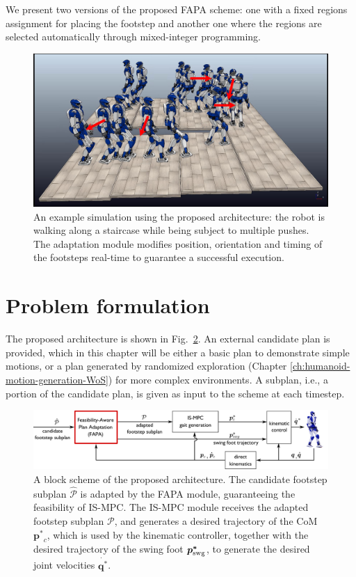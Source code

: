 We present two versions of the proposed FAPA scheme: one with a fixed regions
assignment for placing the footstep and another one where the regions are
selected automatically through mixed-integer programming.

\begin{figure}
    \centering
    \includegraphics[trim={0.5cm 1.5cm 2cm 0.1cm},clip,width=0.9\columnwidth]{figures/strobo-staircase-with-pushes-2.jpeg}
    \caption{An example simulation using the proposed architecture: the robot is walking along a staircase while being subject to multiple pushes. The adaptation module modifies position, orientation and timing of the footsteps real-time to guarantee a successful execution.}
    \label{fig:FAPA:two-patches-mixed-integer-snapshots}
\end{figure}

\section{Problem formulation} 
\label{sec:FAPA:ProblemFormulation}
The proposed architecture is shown in Fig.~\ref{fig:FAPA:block_scheme}.
An external candidate plan is provided, which in this chapter will be either
a basic plan to demonstrate simple motions, or a plan generated by randomized
exploration (Chapter \ref{ch:humanoid-motion-generation-WoS})
for more complex environments.
A subplan, i.e., a portion of the candidate plan, is given as input to the
scheme at each timestep.

\begin{figure}
    \centering\includegraphics[width=\textwidth]{figures/BlockScheme-NLP-STA.pdf}
    \caption{A block scheme of the proposed architecture. The candidate footstep subplan $\mathcal{\hat{P}}$ is adapted by the FAPA module, guaranteeing the feasibility of IS-MPC. The IS-MPC module receives the adapted footstep subplan $\mathcal{P}$, and generates a desired trajectory of the CoM $\bm{p^*}_c$, which is used by the kinematic controller, together with the desired trajectory of the swing foot $\bm{p^*}_{\rm swg}$, to generate the desired joint velocities $\dot{\bm{q^*}}$.}
    \label{fig:FAPA:block_scheme}
    \end{figure}

